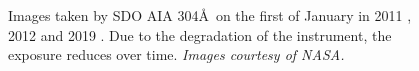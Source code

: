 \documentclass[11pt,a4paper,onecolumn]{report}
\begin{document}
\begin{figure}[t]%
  \centering
  \qquad
  \qquad
  \caption[]{Images taken by SDO AIA 304\AA \ on the first of January in 2011
    , 2012  and 2019
    . Due to the degradation of the instrument, the
    exposure reduces over time. \textit{Images courtesy of NASA.}}
  \label{fig:aia_degradation}
\end{figure}
\end{document}
